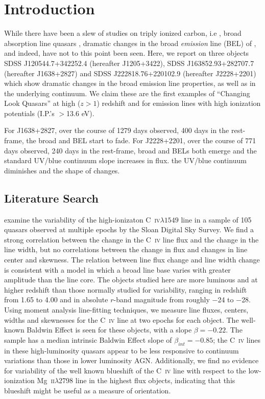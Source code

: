 \documentclass[a4paper,fleqn,usenatbib]{mnras}
\begin{document}
\section{Introduction}
While there have been a slew of studies on triply ionized carbon, i.e \civ, broad absorption line quasars
\citep[BAL QSOs; see e.g. Table 1][]{Hemler2019}, dramatic changes in the 
broad {\it emission} line (BEL) of \civ, and indeed, \ciii have not to this point been seen. 
Here, we report on three objects 
SDSS J120544.7+342252.4  (hereafter J1205+3422), 
SDSS J163852.93+282707.7 (hereafter J1638+2827) and
SDSS J222818.76+220102.9 (hereafter J2228+2201)  
which show dramatic changes in the \civ broad emission line
properties, as well as in the underlying continuum. We claim these are
the first examples of ``Changing Look Quasars'' at high ($z>1$)
redshift and for emission lines with high ionization potentials
(I.P.'s $>$13.6 eV).

For J1638+2827, over the course of 1279 days observed, 400 days in the rest-frame, the  broad \civ and \ciii BEL start to fade.  
For J2228+2201, over the course of 771 days observed, 240 days in the rest-frame, broad \civ and \ciii BELs both emerge and the 
standard UV/blue continuum slope increases in flux. 
the UV/blue continuum diminishes and the shape of \lya changes. 


\subsection{Literature Search}
\citet{Wilhite2006} examine the variability of the high-ionizaton
C~\textsc{iv}$\lambda{1549}$ line in a sample of 105 quasars observed
at multiple epochs by the Sloan Digital Sky Survey.  We find a strong
correlation between the change in the C~\textsc{iv} line flux and the
change in the line width, but no correlations between the change in
flux and changes in line center and skewness.  The relation between
line flux change and line width change is consistent with a model in
which a broad line base varies with greater amplitude than the line
core. The objects studied here are more luminous and at higher
redshift than those normally studied for variability, ranging in
redshift from 1.65 to 4.00 and in absolute $r$-band magnitude from
roughly $-$24 to $-$28.  Using moment analysis line-fitting
techniques, we measure line fluxes, centers, widths and skewnesses for
the C~\textsc{iv} line at two epochs for each object.  The well-known
Baldwin Effect is seen for these objects, with a slope $\beta =
-0.22$.  The sample has a median intrinsic Baldwin Effect slope of
$\beta_{int} = -0.85$; the C~\textsc{iv} lines in these
high-luminosity quasars appear to be less responsive to continuum
variations than those in lower luminosity AGN.  Additionally, we find
no evidence for variability of the well known blueshift of the
C~\textsc{iv} line with respect to the low-ionization
Mg~\textsc{ii}$\lambda$2798 line in the highest flux objects,
indicating that this blueshift might be useful as a measure of
orientation.
\end{document}
